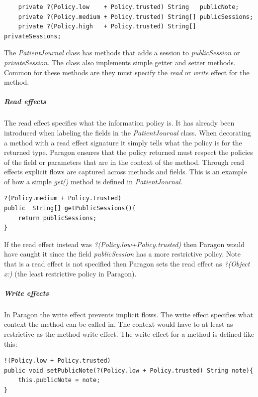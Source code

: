 \begin{lstlisting}
	private ?(Policy.low    + Policy.trusted) String   publicNote;
	private ?(Policy.medium + Policy.trusted) String[] publicSessions;
	private ?(Policy.high   + Policy.trusted) String[] privateSessions;
\end{lstlisting}

The \emph{PatientJournal} class has methods that adds a session to \emph{publicSession} or \emph{privateSession}. The class also implements simple getter and setter methods. Common for these methods are they must specify the \emph{read} or \emph{write} effect for the method.




\subparagraph{Read effects}
The read effect specifies what the information policy is. It has already been introduced when labeling the fields in the \emph{PatientJournal} class. When decorating a method with a read effect signature it simply tells what the policy is for the returned type. Paragon ensures that the policy returned must respect the policies of the field or parameters that are in the context of the method. Through read effects explicit flows are captured across methods and fields. This is an example of how a simple \emph{get()} method is defined in \emph{PatientJournal}.
\begin{lstlisting}
?(Policy.medium + Policy.trusted)
public  String[] getPublicSessions(){
	return publicSessions;
}
\end{lstlisting}

If the read effect instead was \emph{?(Policy.low+Policy.trusted)} then Paragon would have caught it since the field \emph{publicSession} has a more restrictive policy. Note that is a read effect is not specified then Paragon sets the read effect as \emph{?(Object x:)} (the least restrictive policy in Paragon).

\subparagraph{Write effects}
In Paragon the write effect prevents implicit flows. The write effect specifies what context the method can be called in. The context would have to at least as restrictive as the method write effect. The write effect for a method is defined like this:

\begin{lstlisting}
!(Policy.low + Policy.trusted) 
public void setPublicNote(?(Policy.low + Policy.trusted) String note){
	this.publicNote = note;
}
\end{lstlisting}

